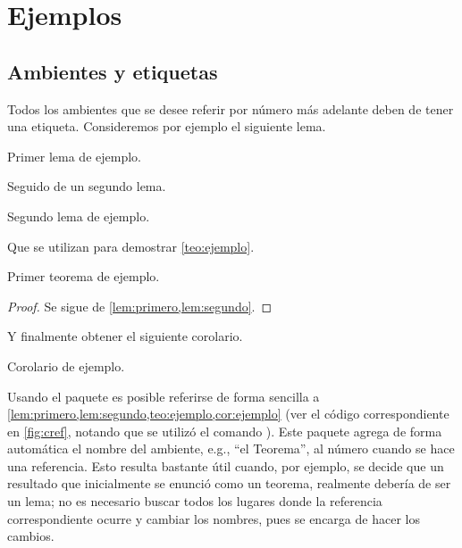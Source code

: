 \chapter{Ejemplos}
\label{cap:ejemplos}

\section{Ambientes y etiquetas}
\label{sec:etiquetas}

Todos los ambientes que se desee referir por n\'umero m\'as adelante deben de
tener una etiqueta.  Consideremos por ejemplo el siguiente lema.

\begin{lema}
\label{lem:primero}
Primer lema de ejemplo.
\end{lema}

Seguido de un segundo lema.

\begin{lema}
\label{lem:segundo}
Segundo lema de ejemplo.
\end{lema}

Que se utilizan para demostrar \cref{teo:ejemplo}.

\begin{teorema}
\label{teo:ejemplo}
Primer teorema de ejemplo.
\end{teorema}

\begin{proof}
Se sigue de \cref{lem:primero,lem:segundo}.
\end{proof}

Y finalmente obtener el siguiente corolario.

\begin{corolario}
\label{cor:ejemplo}
Corolario de ejemplo.
\end{corolario}

Usando el paquete \href{http://tug.ctan.org/tex-archive/macros/latex/contrib/%
cleveref/cleveref.pdf}{} es posible referirse de
forma sencilla a \cref{lem:primero,lem:segundo,teo:ejemplo,cor:ejemplo} (ver el
c\'odigo correspondiente en \cref{fig:cref}, notando que se utiliz\'o el comando
).   Este paquete agrega de forma autom\'atica el
nombre del ambiente, e.g., ``el Teorema'', al n\'umero cuando se hace una
referencia.   Esto resulta bastante \'util cuando, por ejemplo, se decide que un
resultado que inicialmente se enunci\'o como un teorema, realmente deber\'ia de
ser un lema; no es necesario buscar todos los lugares donde la referencia
correspondiente ocurre y cambiar los nombres, pues  se encarga de
hacer los cambios.

